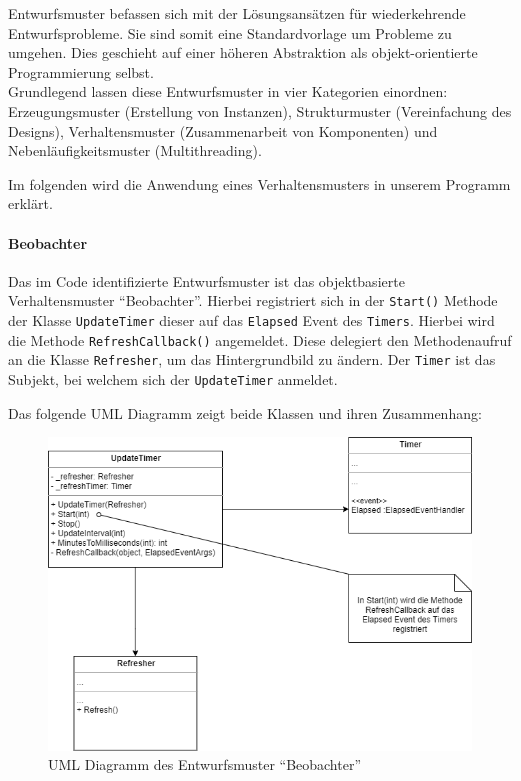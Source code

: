 
Entwurfsmuster befassen sich mit der Lösungsansätzen für wiederkehrende Entwurfsprobleme.
Sie sind somit eine Standardvorlage um Probleme zu umgehen.
Dies geschieht auf einer höheren Abstraktion als objekt-orientierte Programmierung selbst.\\
Grundlegend lassen diese Entwurfsmuster in vier Kategorien einordnen: Erzeugungsmuster (Erstellung von Instanzen), Strukturmuster (Vereinfachung des Designs), Verhaltensmuster (Zusammenarbeit von Komponenten) und Nebenläufigkeitsmuster (Multithreading).

Im folgenden wird die Anwendung eines Verhaltensmusters in unserem Programm erklärt.

\paragraph{Beobachter}
Das im Code identifizierte Entwurfsmuster ist das objektbasierte Verhaltensmuster \enquote{Beobachter}.
Hierbei registriert sich in der \texttt{Start()} Methode der Klasse \texttt{UpdateTimer} dieser auf das \texttt{Elapsed} Event des \texttt{Timers}.
Hierbei wird die Methode \texttt{RefreshCallback()} angemeldet.
Diese delegiert den Methodenaufruf an die Klasse \texttt{Refresher}, um das Hintergrundbild zu ändern.
Der \texttt{Timer} ist das Subjekt, bei welchem sich der \texttt{UpdateTimer} anmeldet.

Das folgende UML Diagramm zeigt beide Klassen und ihren Zusammenhang:

\medspace
\begin{figure}[h]
	\begin{center}
		\includegraphics[width=\linewidth]{Bilder/Beobachter_UML.png}
	\end{center}
	\caption{UML Diagramm des Entwurfsmuster \enquote{Beobachter}}
\end{figure}